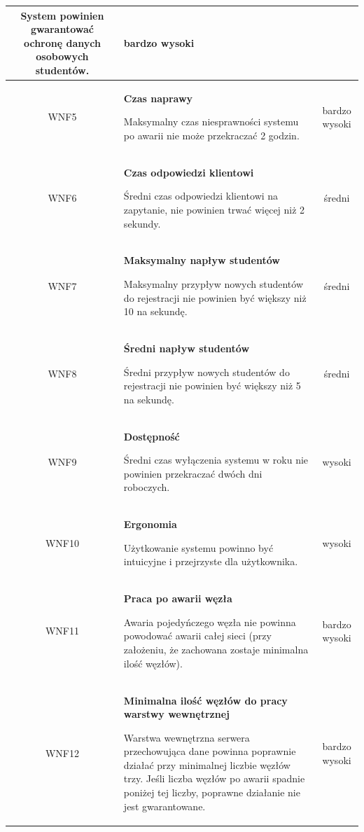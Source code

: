 {\begin{tabularx}{\textwidth}{|c|X|c|}
System powinien gwarantować ochronę danych osobowych studentów.
 & bardzo wysoki\\
\hline

\label{z:WNF5} WNF5 & \textbf{Czas naprawy} 
 
Maksymalny czas niesprawności systemu po awarii nie może przekraczać 2 godzin.
 & bardzo wysoki\\
\hline

\label{z:WNF6} WNF6 & \textbf{Czas odpowiedzi klientowi} 
 
Średni czas odpowiedzi klientowi na zapytanie, nie powinien trwać więcej niż  2 sekundy.
 & średni\\
\hline

\label{z:WNF7} WNF7 & \textbf{Maksymalny napływ studentów} 
 
Maksymalny przypływ nowych studentów do rejestracji nie powinien być większy niż 10 na sekundę.
 & średni\\
\hline

\label{z:WNF8} WNF8 & \textbf{Średni napływ studentów} 
 
Średni przypływ nowych studentów do rejestracji nie powinien być większy niż 5 na sekundę.
 & średni\\
\hline

\label{z:WNF9} WNF9 & \textbf{Dostępność} 
 
Średni czas wyłączenia systemu w roku nie powinien przekraczać dwóch dni roboczych.
 & wysoki\\
\hline

\label{z:WNF10} WNF10 & \textbf{Ergonomia} 
 
Użytkowanie systemu powinno być intuicyjne i przejrzyste dla użytkownika.
 & wysoki\\
\hline

\label{z:WNF11} WNF11 & \textbf{Praca po awarii węzła} 
 
Awaria pojedyńczego węzła nie powinna powodować awarii całej sieci (przy założeniu, że zachowana zostaje minimalna ilość węzłów).
 & bardzo wysoki\\
\hline

\label{z:WNF12} WNF12 & \textbf{Minimalna ilość węzłów do pracy warstwy wewnętrznej} 
 
Warstwa wewnętrzna serwera przechowująca dane powinna poprawnie działać przy minimalnej liczbie węzłów trzy. Jeśli liczba węzłów po awarii spadnie poniżej tej liczby, poprawne działanie nie jest gwarantowane.
 & bardzo wysoki\\
\hline


\end{tabularx}}

